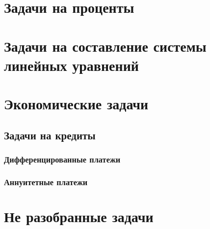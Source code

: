 \chapter{Задачи на проценты}
\chapter{Задачи на составление системы линейных уравнений}
\chapter{Экономические задачи}
	\section{Задачи на кредиты}
		\subsection{Дифференцированные платежи}
		\subsection{Аннуитетные платежи}
\chapter{Не разобранные задачи}
